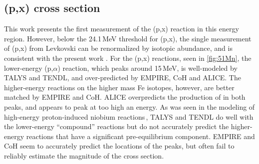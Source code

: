 % 






\subsection{(p,x) cross section}

This work presents the first measurement of the (p,x) reaction in this energy region.
However, below the 24.1\,MeV threshold for (p,x), the single measurement of (p,x) from Levkovski can be renormalized by isotopic abundance, and is consistent  with the present work \cite{levkovski1991cross}.
For the (p,x) reactions, seen in \autoref{fig:51Mn}, the lower-energy  (p,$\alpha$) reaction, which peaks around 15\,MeV, is  well-modeled by TALYS and TENDL, and over-predicted by EMPIRE, CoH and ALICE.
The higher-energy reactions on the higher mass Fe isotopes, however, are better matched by  EMPIRE and CoH.
ALICE overpredicts the production of  in both peaks, and appears to peak at too high an energy.
As was seen in the modeling of high-energy proton-induced niobium reactions\,\cite{Voyles2018a}, TALYS and TENDL do well with the lower-energy \enquote{compound} reactions but do not accurately predict the higher-energy reactions that have a significant pre-equilibrium component.
EMPIRE and CoH seem to accurately predict the locations of the peaks, but often fail to reliably estimate the magnitude of the cross section.

